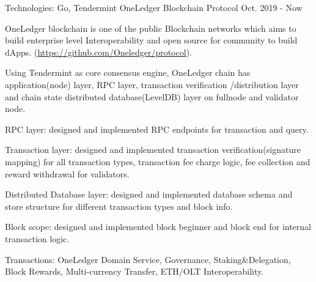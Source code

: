 \begin{cventries}

\cventry
    {Technologies: \quad Go, Tendermint}
    {OneLedger Blockchain Protocol}
    {}
    {Oct. 2019 - Now}
    {
      \begin{cvitems}
        \item {OneLedger blockchain is one of the public Blockchain networks which aims to build enterprise level Interoperability and open source for community to build dApps. (\url{https://github.com/Oneledger/protocol}).}
        \item {Using Tendermint as core consensus engine, OneLedger chain has application(node) layer, RPC layer, transaction verification /distribution layer and chain state distributed database(LevelDB) layer on fullnode and validator node.}
        \item {RPC layer: designed and implemented RPC endpoints for transaction and query.}
        \item {Transaction layer: designed and implemented transaction verification(signature mapping) for all transaction types, transaction fee charge logic, fee collection and reward withdrawal for validators.}
        \item {Distributed Database layer: designed and implemented database schema and store structure for different transaction types and block info.}
        \item {Block scope: designed and implemented block beginner and block end for internal transaction logic.}
        \item {Transactions: OneLedger Domain Service, Governance, Staking\&Delegation, Block Rewards, Multi-currency Transfer, ETH/OLT Interoperability.}
      \end{cvitems}
    }
    

\end{cventries}
